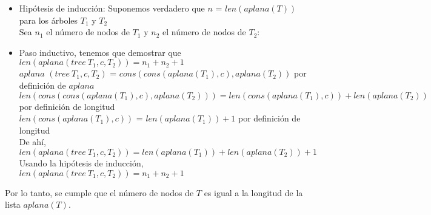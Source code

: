 \documentclass{article}
\begin{document}
\begin{enumerate}
{\begin{enumerate}
{\begin{itemize}
{                    }
					\item {
                       Hipótesis de inducción:
                       Suponemos verdadero que $n$ = $len(aplana(T))$ para los árboles $T_1$ y $T_2$\\
                                           }
                    Sea $n_1$ el número de nodos de $T_1$ y $n_2$ el número de nodos de $T_2$:
                    \item {
                        Paso inductivo, tenemos que demostrar que $len(aplana(tree \ T_1, c, T_2)) = n_1 + n_2 + 1$ \\ 
                        $aplana$ $(tree \ T_1, c, T_2)$ = $cons(cons(aplana(T_1), c), aplana(T_2))$ por definición de $aplana$\\
                        $len(cons(cons(aplana(T_1), c), aplana(T_2))) = len(cons(aplana(T_1), c)) + len(aplana(T_2)) $ por definición de longitud\\
                        $len(cons(aplana(T_1), c))$ = $len(aplana(T_1)) + 1$ por definición de longitud\\
                        De ahí, $len(aplana(tree \ T_1, c, T_2)) = len(aplana(T_1)) + len(aplana(T_2)) + 1 $ \\
                        Usando la hipótesis de inducción, $len(aplana(tree \ T_1, c, T_2)) = n_1 + n_2 + 1$ 
               }
                \end{itemize}
                Por lo tanto, se cumple  que el número de nodos de $T$ es igual a la longitud de la lista $aplana(T)$.
            }\\
                

\end{enumerate}}
\end{enumerate}
\end{document}
